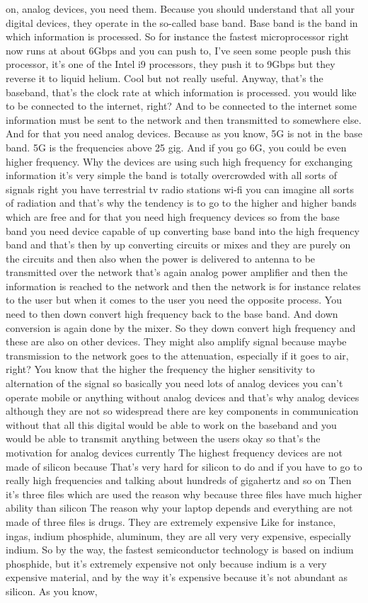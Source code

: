 on, analog devices, you need them. Because you should understand that all your digital devices, they operate in the so-called base band. Base band is the band in which information is processed. So for instance the fastest microprocessor right now runs at about 6Gbps and you can push to, I've seen some people push this processor, it's one of the Intel i9 processors, they push it to 9Gbps but they reverse it to liquid helium. Cool but not really useful. Anyway, that's the baseband, that's the clock rate at which information is processed. you would like to be connected to the internet, right? And to be connected to the internet some information must be sent to the network and then transmitted to somewhere else. And for that you need analog devices. Because as you know, 5G is not in the base band. 5G is the frequencies above 25 gig. And if you go 6G, you could be even higher frequency. Why the devices are using such high frequency for exchanging information it's very simple the band is totally overcrowded with all sorts of signals right you have terrestrial tv radio stations wi-fi you can imagine all sorts of radiation and that's why the tendency is to go to the higher and higher bands which are free and for that you need high frequency devices so from the base band you need device capable of up converting base band into the high frequency band and that's then by up converting circuits or mixes and they are purely on the circuits and then also when the power is delivered to antenna to be transmitted over the network that's again analog power amplifier and then the information is reached to the network and then the network is for instance relates to the user but when it comes to the user you need the opposite process. You need to then down convert high frequency back to the base band. And down conversion is again done by the mixer. So they down convert high frequency and these are also on other devices. They might also amplify signal because maybe transmission to the network goes to the attenuation, especially if it goes to air, right? You know that the higher the frequency the higher sensitivity to alternation of the signal so basically you need lots of analog devices you can't operate mobile or anything without analog devices and that's why analog devices although they are not so widespread there are key components in communication without that all this digital would be able to work on the baseband and you would be able to transmit anything between the users okay so that's the motivation for analog devices currently The highest frequency devices are not made of silicon because That's very hard for silicon to do and if you have to go to really high frequencies and talking about hundreds of gigahertz and so on Then it's three files which are used the reason why because three files have much higher ability than silicon The reason why your laptop depends and everything are not made of three files is drugs. They are extremely expensive Like for instance, ingas, indium phosphide, aluminum, they are all very very expensive, especially indium. So by the way, the fastest semiconductor technology is based on indium phosphide, but it's extremely expensive not only because indium is a very expensive material, and by the way it's expensive because it's not abundant as silicon. As you know, 